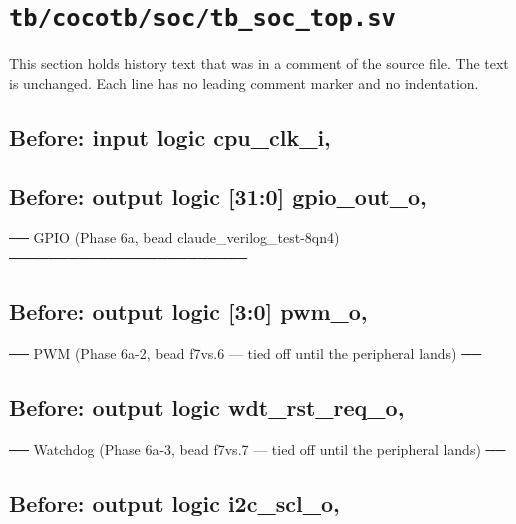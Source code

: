 \section{\texttt{tb/cocotb/soc/tb\_soc\_top.sv}}\label{cr:suite:soc-tb-soc-top-sv}

This section holds history text that was in a comment of the source file. The text is unchanged. Each line has no leading comment marker and no indentation.

\begin{record}

\subsection*{Before: input  logic        cpu\_clk\_i,}


\subsection*{Before: output logic [31:0] gpio\_out\_o,}

\begin{textblock}
── GPIO (Phase 6a, bead claude_verilog_test-8qn4) ────────────────────────
\end{textblock}

\subsection*{Before: output logic [3:0]  pwm\_o,}

\begin{textblock}
── PWM (Phase 6a-2, bead f7vs.6 — tied off until the peripheral lands) ──
\end{textblock}

\subsection*{Before: output logic        wdt\_rst\_req\_o,}

\begin{textblock}
── Watchdog (Phase 6a-3, bead f7vs.7 — tied off until the peripheral lands) ──
\end{textblock}

\subsection*{Before: output logic        i2c\_scl\_o,}


\end{record}
